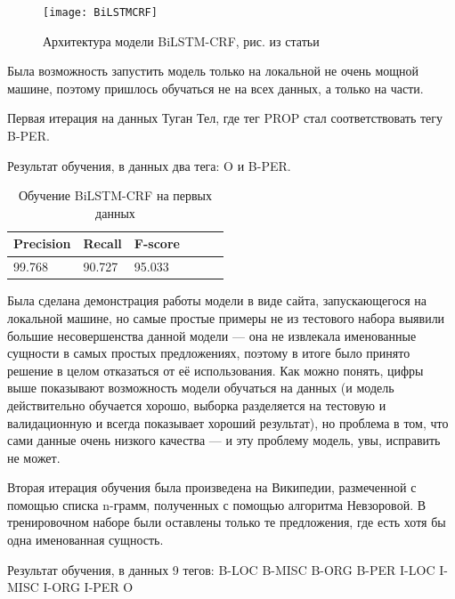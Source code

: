 \begin{figure}[H]
\caption{Архитектура модели BiLSTM-CRF, рис. из статьи \cite{ju-etal-2018-neural}}
\texttt{[image: BiLSTMCRF]}
\label{fig:BiLSTMCRF}
\end{figure}


Была возможность запустить модель только на локальной не очень мощной машине, поэтому пришлось обучаться не на всех данных, а только на части.

Первая итерация на данных Туган Тел, где тег PROP стал соответствовать тегу B-PER.

Результат обучения, в данных два тега: O и B-PER.

\vspace{1cm}

\begin{table}[h]
\begin{tabular}{ | l | l | l | l | l | l |}
\hline
Precision  &   Recall   &  F-score   \\

\hline
99.768     & 90.727     & 95.033      \\
\hline
\end{tabular}
\caption{Обучение BiLSTM-CRF на первых данных}
\end{table}

\vspace{1cm}

Была сделана демонстрация работы модели в виде сайта, запускающегося на локальной машине, но самые простые примеры не из тестового набора выявили большие несовершенства данной модели --- она не извлекала именованные сущности в самых простых предложениях, поэтому в итоге было принято решение в целом отказаться от её использования. %
Как можно понять, цифры выше показывают возможность модели обучаться на данных (и модель действительно обучается хорошо, выборка разделяется на тестовую и валидационную и всегда показывает хороший результат), но проблема в том, что сами данные очень низкого качества --- и эту проблему модель, увы, исправить не может.

Вторая итерация обучения была произведена на Википедии, размеченной с помощью списка n-грамм, полученных с помощью алгоритма Невзоровой. В тренировочном наборе были оставлены только те предложения, где есть хотя бы одна именованная сущность.

Результат обучения, в данных 9 тегов:
B-LOC
B-MISC
B-ORG
B-PER
I-LOC
I-MISC
I-ORG
I-PER
O
\vspace{1cm}

